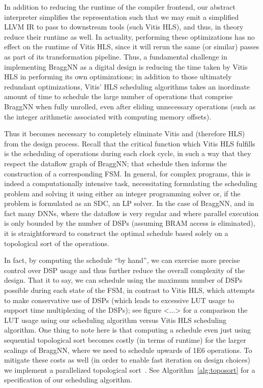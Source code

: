 {In addition to reducing the runtime of the compiler frontend, our abstract interpreter simplifies the representation such that we may emit a simplified LLVM IR to pass to downstream tools (such Vitis HLS), and thus, in theory reduce their runtime as well.
In actuality, performing these optimizations has no effect on the runtime of Vitis HLS, since it will rerun the same (or similar) passes as part of its transformation pipeline.
Thus, a fundamental challenge in implementing BraggNN as a digital design is reducing the time taken by Vitis HLS in performing its own optimizations; in addition to those ultimately redundant optimizations, Vitis' HLS scheduling algorithms takes an inordinate amount of time to schedule the large number of operations that comprise BraggNN when fully unrolled, even after eliding unnecessary operations (such as the integer arithmetic associated with computing memory offsets).

Thus it becomes necessary to completely eliminate Vitis and (therefore HLS) from the design process.
Recall that the critical function which Vitis HLS fulfills is the scheduling of operations during each clock cycle, in such a way that they respect the dataflow graph of BraggNN; that schedule then informs the construction of a corresponding FSM.
In general, for complex programs, this is indeed a computationally intensive task, necessitating formulating the scheduling problem and solving it using either an integer programming solver or, if the problem is formulated as an SDC, an LP solver.
In the case of BraggNN, and in fact many DNNs, where the dataflow is very regular and where parallel execution is only bounded by the number of DSPs (assuming BRAM access is eliminated), it is straightforward to construct the optimal schedule based solely on a topological sort of the operations.

In fact, by computing the schedule ``by hand'', we can exercise more precise control over DSP usage and thus further reduce the overall complexity of the design.
That it to say, we can schedule using the maximum number of DSPs possible during each state of the FSM, in contrast to Vitis HLS, which attempts to make conservative use of DSPs (which leads to excessive LUT usage to support time multiplexing of the DSPs); see figure <...> for a comparison the LUT usage using our scheduling algorithm versus Vitis HLS scheduling algorithm.
One thing to note here is that computing a schedule even just using sequential topological sort becomes costly (in terms of runtime) for the larger scalings of BraggNN, where we need to schedule upwards of 1E6 operations.
To mitigate these costs as well (in order to enable fast iteration on design choices) we implement a parallelized topological sort~\cite{sanders2019sequential}.
See Algorithm~\ref{alg:toposort} for a specification of our scheduling algorithm.

}
